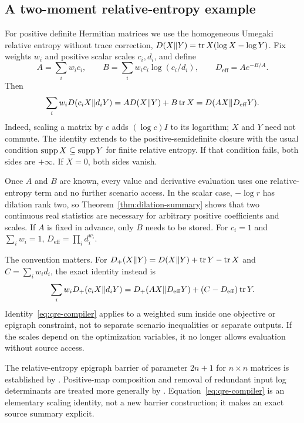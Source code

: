 \subsection{A two-moment relative-entropy example}

For positive definite Hermitian matrices we use the homogeneous Umegaki
relative entropy without trace correction,
$D(X\|Y)=\operatorname{tr} X(\log X-\log Y)$. Fix weights $w_i$ and positive
scalar scales $c_i,d_i$, and define
\begin{equation}\label{eq:qre-moments}
 A=\sum_iw_ic_i,
 \qquad B=\sum_iw_ic_i\log(c_i/d_i),
 \qquad D_{\mathrm{eff}}=A e^{-B/A}.
\end{equation}
Then
\begin{equation}\label{eq:qre-compiler}
 \sum_iw_iD(c_iX\|d_iY)
     =A D(X\|Y)+B\operatorname{tr} X
     =D(AX\|D_{\mathrm{eff}}Y).
\end{equation}
Indeed, scaling a matrix by $c$ adds $(\log c)I$ to its logarithm;
$X$ and $Y$ need not commute. The identity extends to the
positive-semidefinite closure with the usual condition
$\operatorname{supp} X\subseteq\operatorname{supp} Y$ for finite relative entropy. If that condition
fails, both sides are $+\infty$. If $X=0$, both sides vanish.

Once $A$ and $B$ are known, every value and derivative evaluation uses
one relative-entropy term and no further scenario access. In the scalar
case, $-\log r$ has dilation rank two, so
Theorem~\ref{thm:dilation-summary} shows that two continuous real
statistics are necessary for arbitrary positive coefficients and scales. If $A$ is fixed in advance, only
$B$ needs to be stored. For $c_i=1$ and $\sum_iw_i=1$,
$D_{\mathrm{eff}}=\prod_i d_i^{w_i}$.

The convention matters. For
$D_+(X\|Y)=D(X\|Y)+\operatorname{tr} Y-\operatorname{tr} X$ and
$C=\sum_iw_id_i$, the exact identity instead is
\[
 \sum_iw_iD_+(c_iX\|d_iY)
 =D_+(AX\|D_{\mathrm{eff}}Y)+(C-D_{\mathrm{eff}})\operatorname{tr} Y.
\]
Identity~\eqref{eq:qre-compiler} applies to a weighted sum inside one
objective or epigraph constraint, not to separate scenario inequalities
or separate outputs. If the scales depend on the optimization variables,
it no longer allows evaluation without source access.

The relative-entropy epigraph barrier of parameter $2n+1$ for $n\times n$
matrices is established by \citet{FS2023}. Positive-map composition and
removal of redundant input log determinants are treated more generally
by \citet{HeSaundersonFawzi2026}. Equation~\eqref{eq:qre-compiler} is an elementary
scaling identity, not a new barrier construction; it makes an exact
source summary explicit.

